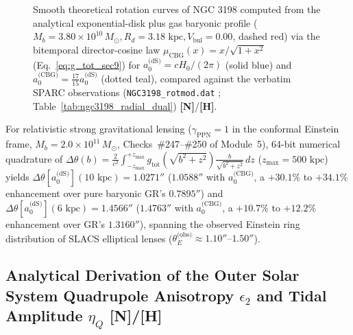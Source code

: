 \documentclass[11pt,a4paper]{article}
\newcommand{\catH}{\textbf{\textcolor{orange!85!black}{[H]}}}
\newcommand{\catN}{\textbf{\textcolor{teal!75!black}{[N]}}}
\theoremstyle{definition}
\theoremstyle{remark}
\begin{document}
\begin{figure}[H]
  \caption{Smooth theoretical rotation curves of NGC 3198 computed from the analytical exponential-disk plus gas baryonic profile ($M_b = 3.80 \times 10^{10}\,M_{\odot}, R_d = 3.18\text{ kpc}, V_{\text{bul}} = 0.00$, dashed red) via the bitemporal director-cosine law $\mu_{\text{CBG}}(x) = x/\sqrt{1+x^2}$ (Eq.~\ref{eq:g_tot_sec9}) for $a_0^{\text{(dS)}} = cH_0/(2\pi)$ (solid blue) and $a_0^{\text{(CBG)}} = \frac{17}{15}a_0^{\text{(dS)}}$ (dotted teal), compared against the verbatim SPARC observations (\texttt{NGC3198\_rotmod.dat} \cite{Lelli2016}; Table~\ref{tab:ngc3198_radial_dual}) \catN/\catH.}
  \label{fig:ngc3198_rotation_curve}
\end{figure}

For relativistic strong gravitational lensing ($\gamma_{\text{PPN}} = 1$ in the conformal Einstein frame, $M_b = 2.0 \times 10^{11}\,M_{\odot}$, Checks~\#247--\#250 of Module~5), 64-bit numerical quadrature of $\Delta\theta(b) = \frac{2}{c^2}\int_{-z_{\max}}^{+z_{\max}} g_{\text{tot}}(\sqrt{b^2+z^2})\frac{b}{\sqrt{b^2+z^2}}\,dz$ ($z_{\max} = 500\text{ kpc}$) yields $\Delta\theta[a_0^{\text{(dS)}}](10\text{ kpc}) = \mathbf{1.0271''}$ ($\mathbf{1.0588''}$ with $a_0^{\text{(CBG)}}$, a $+30.1\%$ to $+34.1\%$ enhancement over pure baryonic GR's $0.7895''$) and $\Delta\theta[a_0^{\text{(dS)}}](6\text{ kpc}) = \mathbf{1.4566''}$ ($\mathbf{1.4763''}$ with $a_0^{\text{(CBG)}}$, a $+10.7\%$ to $+12.2\%$ enhancement over GR's $1.3160''$), spanning the observed Einstein ring distribution of SLACS elliptical lenses ($\theta_E^{\text{(obs)}} \approx 1.10''\text{--}1.50''$).

\subsection{\texorpdfstring{Analytical Derivation of the Outer Solar System Quadrupole Anisotropy $\epsilon_2$ and Tidal Amplitude $\eta_Q$ \catN/\catH}{Analytical Derivation of the Outer Solar System Quadrupole Anisotropy and Tidal Amplitude}}
\end{document}
